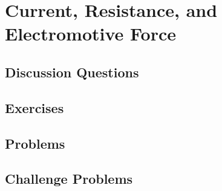 
\chapter{Current, Resistance, and Electromotive Force}

\section{Discussion Questions}

\section{Exercises}

\section{Problems}

\section{Challenge Problems}
